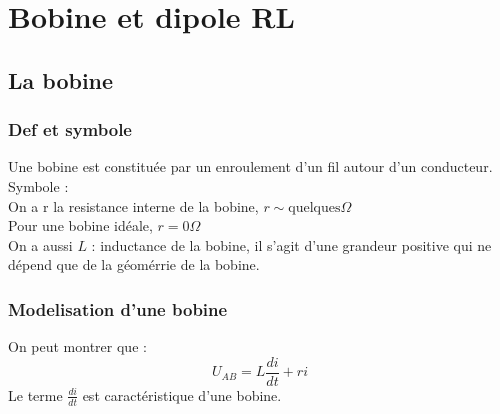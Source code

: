 \chapter{Bobine et dipole RL}
\section{La bobine}
\subsection{Def et symbole}
\begin{definition}[Bobine]\label{def:bobine}
    Une bobine est constituée par un enroulement d'un fil autour d'un conducteur.\\
    Symbole : \\
    On a r la resistance interne de la bobine, \(r \sim \text{quelques} \Omega \)\\
    Pour une bobine idéale, \(r = 0 \Omega \) \\
    On a aussi \(L\)  : inductance de la bobine, il s'agit d'une grandeur positive qui ne dépend que de la géomérrie de la bobine.
\end{definition}

\subsection{Modelisation d'une bobine}
\begin{center}
    \hspace{1cm}
\end{center}
On peut montrer que : 
\[
    U_{AB} = L \frac{di}{dt} + ri
\]
Le terme \(\frac{di}{dt}\) est caractéristique d'une bobine. 

